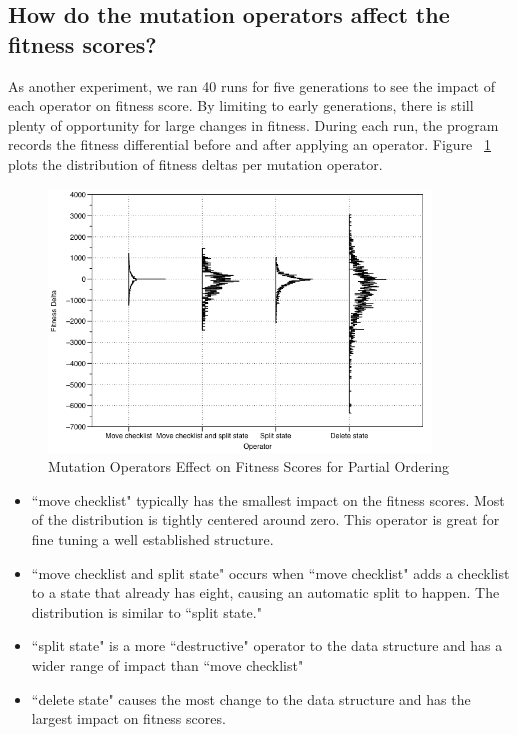\documentclass[preprint,12pt,3p]{elsarticle}
\begin{document}
\subsection{How do the mutation operators affect the fitness scores?}
As another experiment, we ran 40 runs for five generations to see the impact of each operator on fitness score. By limiting to early generations, there is still plenty of opportunity for large changes in fitness. During each run, the program records the fitness differential before and after applying an operator. Figure ~\ref{OperatorsPartialOrdering} plots the distribution of fitness deltas per mutation operator.

\begin{figure}[ht]
\includegraphics[width=4.0in]{images/operator_analysis_partial_order_first_5_gens}
\caption{Mutation Operators Effect on Fitness Scores for Partial Ordering}
\label{OperatorsPartialOrdering}
\end{figure}

\begin{itemize}
  \item ``move checklist" typically has the smallest impact on the fitness scores. Most of the distribution is tightly centered around zero. This operator is great for fine tuning a well established structure. 
  \item ``move checklist and split state" occurs when ``move checklist" adds a  checklist to a state that already has eight, causing an automatic split to happen. The distribution is similar to ``split state."
  \item ``split state" is a more ``destructive" operator to the data structure and has a wider range of impact than ``move checklist"
  \item ``delete state" causes the most change to the data structure and has the largest impact on fitness scores. 
\end{itemize}
\end{document}
